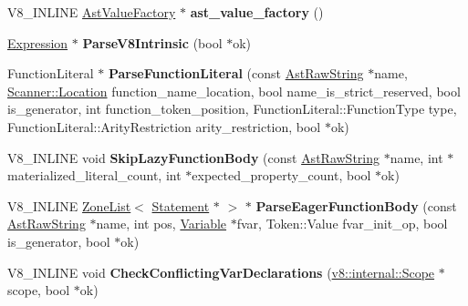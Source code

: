 \begin{DoxyCompactItemize}
\item 
\hypertarget{classv8_1_1internal_1_1_parser_traits_a931364ec17a5c35e7747186c10e46e7e}{}V8\+\_\+\+I\+N\+L\+I\+N\+E \hyperlink{classv8_1_1internal_1_1_ast_value_factory}{Ast\+Value\+Factory} $\ast$ {\bfseries ast\+\_\+value\+\_\+factory} ()\label{classv8_1_1internal_1_1_parser_traits_a931364ec17a5c35e7747186c10e46e7e}

\item 
\hypertarget{classv8_1_1internal_1_1_parser_traits_a4c1035a3d38d18d607affbac41dc5a42}{}\hyperlink{classv8_1_1internal_1_1_expression}{Expression} $\ast$ {\bfseries Parse\+V8\+Intrinsic} (bool $\ast$ok)\label{classv8_1_1internal_1_1_parser_traits_a4c1035a3d38d18d607affbac41dc5a42}

\item 
\hypertarget{classv8_1_1internal_1_1_parser_traits_a8abfb2af319f92cb4ee476505ac6e31f}{}Function\+Literal $\ast$ {\bfseries Parse\+Function\+Literal} (const \hyperlink{classv8_1_1internal_1_1_ast_raw_string}{Ast\+Raw\+String} $\ast$name, \hyperlink{structv8_1_1internal_1_1_scanner_1_1_location}{Scanner\+::\+Location} function\+\_\+name\+\_\+location, bool name\+\_\+is\+\_\+strict\+\_\+reserved, bool is\+\_\+generator, int function\+\_\+token\+\_\+position, Function\+Literal\+::\+Function\+Type type, Function\+Literal\+::\+Arity\+Restriction arity\+\_\+restriction, bool $\ast$ok)\label{classv8_1_1internal_1_1_parser_traits_a8abfb2af319f92cb4ee476505ac6e31f}

\item 
\hypertarget{classv8_1_1internal_1_1_parser_traits_a3d7bd9f0e3543a7cd05383de441400f7}{}V8\+\_\+\+I\+N\+L\+I\+N\+E void {\bfseries Skip\+Lazy\+Function\+Body} (const \hyperlink{classv8_1_1internal_1_1_ast_raw_string}{Ast\+Raw\+String} $\ast$name, int $\ast$materialized\+\_\+literal\+\_\+count, int $\ast$expected\+\_\+property\+\_\+count, bool $\ast$ok)\label{classv8_1_1internal_1_1_parser_traits_a3d7bd9f0e3543a7cd05383de441400f7}

\item 
\hypertarget{classv8_1_1internal_1_1_parser_traits_a107bacae1a2ef79bdea06bfe916b547d}{}V8\+\_\+\+I\+N\+L\+I\+N\+E \hyperlink{classv8_1_1internal_1_1_zone_list}{Zone\+List}$<$ \hyperlink{classv8_1_1internal_1_1_statement}{Statement} $\ast$ $>$ $\ast$ {\bfseries Parse\+Eager\+Function\+Body} (const \hyperlink{classv8_1_1internal_1_1_ast_raw_string}{Ast\+Raw\+String} $\ast$name, int pos, \hyperlink{classv8_1_1internal_1_1_variable}{Variable} $\ast$fvar, Token\+::\+Value fvar\+\_\+init\+\_\+op, bool is\+\_\+generator, bool $\ast$ok)\label{classv8_1_1internal_1_1_parser_traits_a107bacae1a2ef79bdea06bfe916b547d}

\item 
\hypertarget{classv8_1_1internal_1_1_parser_traits_a4b9edd9f74f476d66c2e8d86453a26b4}{}V8\+\_\+\+I\+N\+L\+I\+N\+E void {\bfseries Check\+Conflicting\+Var\+Declarations} (\hyperlink{classv8_1_1internal_1_1_scope}{v8\+::internal\+::\+Scope} $\ast$scope, bool $\ast$ok)\label{classv8_1_1internal_1_1_parser_traits_a4b9edd9f74f476d66c2e8d86453a26b4}

\end{DoxyCompactItemize}
